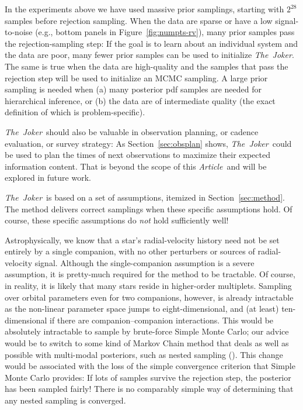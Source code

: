 \documentclass[manuscript, letterpaper]{aastex6}
\newcommand{\project}[1]{\textsl{#1}}
\newcommand{\samplername}{\project{The~Joker}}
\newcommand{\documentname}{\textsl{Article}}
\newcommand{\sectionname}{Section}
\newcommand{\figname}{Figure}
\begin{document}
In the experiments above we have used massive prior samplings, starting with
$2^{28}$ samples before rejection sampling.
When the data are sparse or have a low signal-to-noise (e.g., bottom panels in
\figname~\ref{fig:numpts-rv}), many prior samples pass the rejection-sampling
step:
If the goal is to learn about an individual system and the data are poor, many
fewer prior samples can be used to initialize \samplername.
The same is true when the data are high-quality and the samples that pass the
rejection step will be used to initialize an MCMC sampling.
A large prior sampling is needed when (a) many posterior pdf samples are needed
for hierarchical inference, or (b) the data are of intermediate quality (the
exact definition of which is problem-specific).

\samplername\ should also be valuable in observation planning, or cadence
evaluation, or survey strategy:
As \sectionname~\ref{sec:obsplan} shows,
\samplername\ could be used to plan the times of next observations to maximize
their expected information content.
That is beyond the scope of this \documentname\ and will be explored in future
work.

\samplername\ is based on a set of assumptions, itemized in
\sectionname~\ref{sec:method}.
The method delivers correct samplings when these specific assumptions hold.
Of course, these specific assumptions do \emph{not} hold sufficiently well!

Astrophysically, we know that a star's radial-velocity history
need not be set entirely by a single companion, with no other perturbers or
sources of radial-velocity signal.
Although the single-companion assumption is a severe assumption, it
is pretty-much required for the method to be tractable.
Of course, in reality, it is likely that many stars reside in higher-order
multiplets.
Sampling over orbital parameters even for two companions, however, is already
intractable as the non-linear parameter space jumps to eight-dimensional, and
(at least) ten-dimensional if there are companion--companion interactions.
This would be absolutely intractable to sample by brute-force Simple
Monte Carlo; our advice would be to switch to some kind of Markov
Chain method that deals as well as possible with multi-modal
posteriors, such as nested sampling (\citealt{Skilling:2004, Brewer:2009}).
This change would be associated with the loss of the simple
convergence criterion that Simple Monte Carlo provides: If lots of
samples survive the rejection step, the posterior has been sampled
fairly!
There is no comparably simple way of determining that any nested
sampling is converged.
\end{document}
